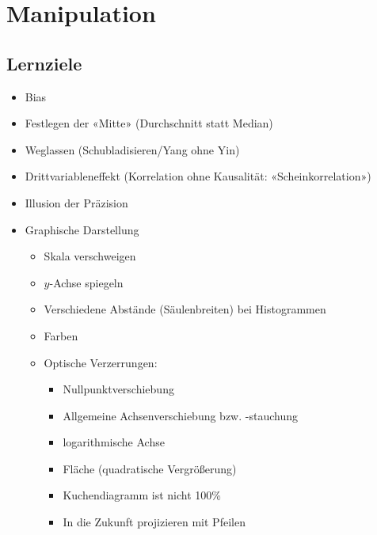 
\section{Manipulation}

\subsection*{Lernziele}

\begin{itemize}
\item Bias 
\item Festlegen der «Mitte» (Durchschnitt statt Median) 
\item Weglassen (Schubladisieren/Yang ohne Yin)
\item Drittvariableneffekt (Korrelation ohne Kausalität: «Scheinkorrelation»)
\item Illusion der Präzision
\item Graphische Darstellung 
  \begin{itemize}
  \item Skala verschweigen
  \item $y$-Achse spiegeln
  \item Verschiedene Abstände (Säulenbreiten) bei Histogrammen
  \item Farben
  \item Optische Verzerrungen:
    \begin{itemize}
    \item Nullpunktverschiebung
    \item Allgemeine Achsenverschiebung bzw. -stauchung
    \item logarithmische Achse
    \item Fläche (quadratische Vergrößerung)
    \item Kuchendiagramm ist nicht 100\%
    \item In die Zukunft projizieren mit Pfeilen
    \end{itemize}
  \end{itemize}
\end{itemize}

